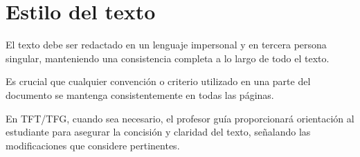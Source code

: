 \chapter{Estilo del texto}
El texto debe ser redactado en un lenguaje impersonal y en tercera persona singular, manteniendo una consistencia completa a lo largo de todo el texto.  

Es crucial que cualquier convención o criterio utilizado en una parte del documento se mantenga consistentemente en todas las páginas.  

En TFT/TFG, cuando sea necesario, el profesor guía proporcionará orientación al estudiante para asegurar la concisión y claridad del texto, señalando las modificaciones que considere pertinentes. 
